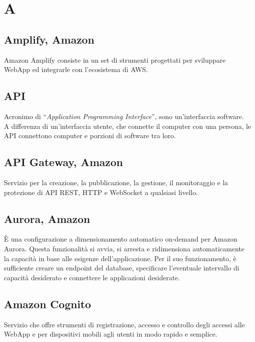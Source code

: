 \section{A}

\subsection{Amplify, Amazon}
Amazon Amplify consiste in un set di strumenti progettati per sviluppare WebApp ed integrarle con l'ecosistema di AWS. 

\subsection{API}
Acronimo di “\textit{Application Programming Interface}”, sono un’interfaccia software. A differenza di un’interfaccia utente, che connette il computer con una persona, le API connettono computer e porzioni di software tra loro.

\subsection{API Gateway, Amazon}
Servizio per la creazione, la pubblicazione, la gestione, il monitoraggio e la protezione di API REST, HTTP e WebSocket a qualsiasi livello.

\subsection{Aurora, Amazon}
È una configurazione a dimensionamento automatico on-demand per Amazon Aurora. Questa funzionalità si avvia, si arresta e ridimensiona automaticamente la capacità in base alle esigenze dell'applicazione. Per il suo funzionamento, è sufficiente creare un endpoint del database, specificare l'eventuale intervallo di capacità desiderato e connettere le applicazioni desiderate.  

\subsection{Amazon Cognito}
Servizio che offre strumenti di registrazione, accesso e controllo degli accessi alle WebApp e per dispositivi mobili agli utenti in modo rapido e semplice.


